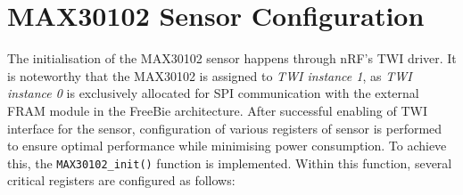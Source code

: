     
    


\section{MAX30102 Sensor Configuration}
\label{sec:sensor_config}
The initialisation of the MAX30102 sensor happens through nRF's TWI driver. It is noteworthy that the MAX30102 is assigned to \textit{TWI instance 1}, as \textit{TWI instance 0} is exclusively allocated for SPI communication with the external FRAM module in the FreeBie architecture. After successful enabling of TWI interface for the sensor, configuration of various registers of sensor is performed to ensure optimal performance while minimising power consumption. To achieve this, the \texttt{MAX30102\_init()} function is implemented. Within this function, several critical registers are configured as follows:

